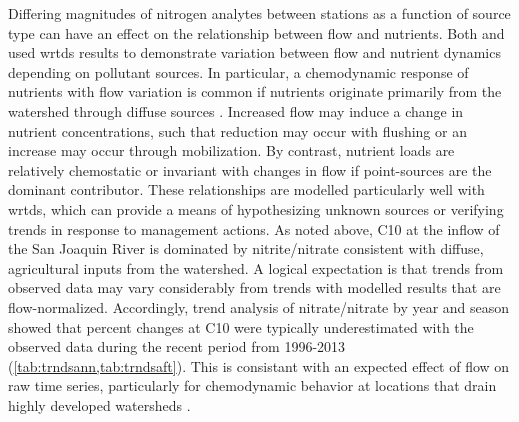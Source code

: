 \documentclass[letterpaper,12pt,oneside]{article}\usepackage[]{graphicx}\usepackage[]{color}
\begin{document}
Differing magnitudes of nitrogen analytes between stations as a function of source type can have an effect on the relationship between flow and nutrients.  Both \citet{Hirsch10} and \citet{Beck15b} used \ac{wrtds} results to demonstrate variation between flow and nutrient dynamics depending on pollutant sources.  In particular, a chemodynamic response of nutrients with flow variation is common if nutrients originate primarily from the watershed through diffuse sources \citep{Thompson11,Wan17}.  Increased flow may induce a change in nutrient concentrations, such that reduction may occur with flushing or an increase may occur through mobilization.  By contrast, nutrient loads are relatively chemostatic or invariant with changes in flow if point-sources are the dominant contributor.  These relationships are modelled particularly well with \ac{wrtds}, which can provide a means of hypothesizing unknown sources or verifying trends in response to management actions.  As noted above, C10 at the inflow of the San Joaquin River is dominated by nitrite/nitrate consistent with diffuse, agricultural inputs from the watershed.  A logical expectation is that trends from observed data may vary considerably from trends with modelled results that are flow-normalized.  Accordingly, trend analysis of nitrate/nitrate by year and season showed that percent changes at C10 were typically underestimated with the observed data during the recent period from 1996-2013 (\cref{tab:trndsann,tab:trndsaft}).  This is consistant with an expected effect of flow on raw time series, particularly for chemodynamic behavior at locations that drain highly developed watersheds \citep{Wan17}.
\end{document}
